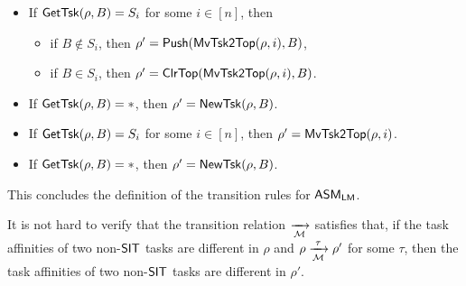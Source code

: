 	\noindent {}
	\begin{itemize}
		\item If $\mathsf{GetTsk}(\rho, B) = S_i$ for some $i\in[n]$, then
		\begin{itemize}
			\item if $B \not \in S_i$, then $\rho' = \mathsf{Push}(\mathsf{MvTsk2Top}(\rho, i), B)$,
			\item if $B  \in S_i$, 	then $\rho' =  \mathsf{ClrTop}(\mathsf{MvTsk2Top}(\rho, i), B)$.
		\end{itemize}
		\item If $\mathsf{GetTsk}(\rho, B) = *$, then $\rho' = \mathsf{NewTsk}(\rho, B)$.
	\end{itemize}
	
	\noindent {}
	\begin{itemize}
		\item If $\mathsf{GetTsk}(\rho, B) = S_i$ for some $i \in [n]$, then $\rho' = \mathsf{MvTsk2Top}(\rho, i)$.
		\item If $\mathsf{GetTsk}(\rho, B) = *$, then $\rho' = \mathsf{NewTsk}(\rho, B)$.
	\end{itemize}
	
	This concludes the definition of the transition rules for $\textsf{ASM}_\textsf{LM}$. 
	
	
	

It is not hard to verify that the transition relation $\xrightarrow[{\mathcal{M} }]{}$ %
	satisfies that, if the task affinities of two non-${\sf SIT}$ tasks are different in $\rho$ and $\rho \xrightarrow[{\mathcal{M} }]{\tau} \rho'$ for some $\tau$, then the task affinities of two non-${\sf SIT}$ tasks are different in $\rho'$. 
	
